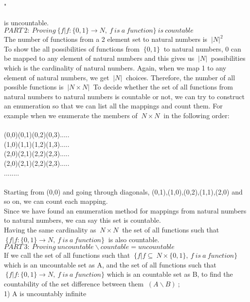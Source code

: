 " \documentclass[10pt]{article}
\begin{document}
 is uncountable.\\
  $PART \ 2:  \ Proving \ \{f | f : \{0, 1\} \rightarrow  N, \ f \ is \ a \ function\} \ is \ countable$\\
  The number of functions from a 2 element set to natural numbers is
  $\ |N|^2$\\
  To show the all possibilities of functions from 
  $ \ \{0,1\} \ $
  to natural numbers, 0 can be mapped to any element of natural numbers and this gives us
   $\ |N| \ $
   possibilities which is the cardinality of natural numbers. Again, when we map 1 to any element of natural numbers, we get 
   $\ |N|\ $
   choices. Therefore, the number of all possible functions is 
   $\ |N \times N|\ $
   To decide whether the set of all functions from natural numbers to natural numbers is countable or not, we can try to construct an enumeration so that we can list all the mappings and count them. 
   For example when we enumerate the members of
   $\ N \times N\ $ 
   in the following order:\\\\
    (0,0)(0,1)(0,2)(0,3).....\\
   (1,0)(1,1)(1,2)(1,3).....\\
   (2,0)(2,1)(2,2)(2,3).....\\
   (2,0)(2,1)(2,2)(2,3).....\\
   ........\\\\
   Starting from (0,0) and going through diagonals, (0,1),(1,0),(0,2),(1,1),(2,0) and so on, we can count each mapping.\\
   Since we have found an enumeration method for mappings from natural numbers to natural numbers, we can say this set is countable.\\
   Having the same cardinality as
   $\ N \times N\ $
   the set of all functions such that
   $\ \{f | f : \{0, 1\} \rightarrow  N, \ f \ is \ a \ function\} \ $
   is also countable.\\
  $PART \ 3:  \ Proving \ uncountable \backslash countable= uncountable$\\
  If we call the set of all functions such that
  $ \ \{f | f \subseteq \ N \times \{0, 1\}, \ f \ is \ a \ function\}$
  which is an uncountable set as A, and the set of all functions such that 
  $\ \{f | f : \{0, 1\} \rightarrow  N, \ f \ is \ a \ function\}$
  which is an countable set as B, to find the countability of the set difference between them 
  $\ (A \backslash B) \ ;$\\
  1) A is uncountably infinite\\
\end{document}

